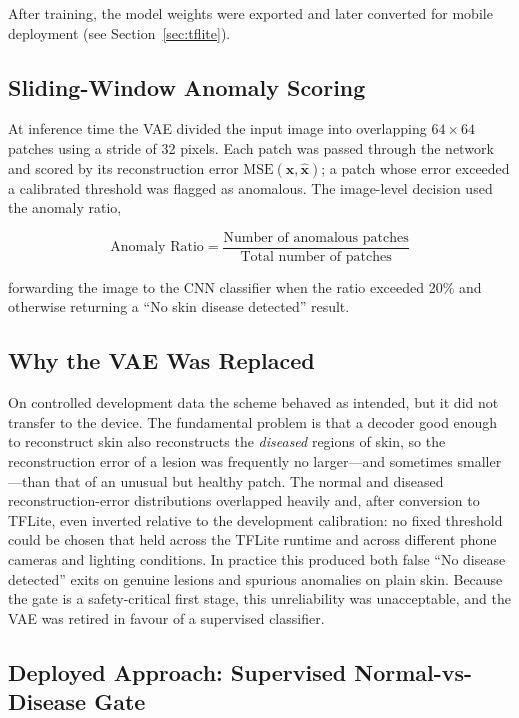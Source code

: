 After training, the model weights were exported and later converted for mobile deployment (see Section~\ref{sec:tflite}).

\subsection{Sliding-Window Anomaly Scoring}

At inference time the VAE divided the input image into overlapping $64 \times 64$ patches using a stride of 32 pixels. Each patch was passed through the network and scored by its reconstruction error $\text{MSE}(\mathbf{x}, \hat{\mathbf{x}})$; a patch whose error exceeded a calibrated threshold was flagged as anomalous. The image-level decision used the anomaly ratio,

\begin{equation}
\text{Anomaly Ratio} = \frac{\text{Number of anomalous patches}}{\text{Total number of patches}}
\end{equation}

\noindent forwarding the image to the CNN classifier when the ratio exceeded 20\% and otherwise returning a ``No skin disease detected'' result.

\subsection{Why the VAE Was Replaced}

On controlled development data the scheme behaved as intended, but it did not
transfer to the device. The fundamental problem is that a decoder good enough to
reconstruct skin also reconstructs the \emph{diseased} regions of skin, so the
reconstruction error of a lesion was frequently no larger---and sometimes
smaller---than that of an unusual but healthy patch. The normal and diseased
reconstruction-error distributions overlapped heavily and, after conversion to
TFLite, even inverted relative to the development calibration: no fixed threshold
could be chosen that held across the TFLite runtime and across different phone
cameras and lighting conditions. In practice this produced both false
``No disease detected'' exits on genuine lesions and spurious anomalies on plain
skin. Because the gate is a safety-critical first stage, this unreliability was
unacceptable, and the VAE was retired in favour of a supervised classifier.

\subsection{Deployed Approach: Supervised Normal-vs-Disease Gate}
\label{sec:supervised_gate}

